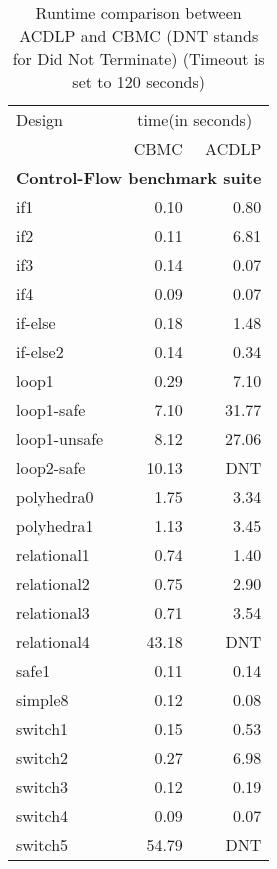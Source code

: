 \documentclass{article}
\begin{document}
\begin{table}[!b]
\begin{center}
{
\begin{tabular}{l|r|r}
\hline
  Design & \multicolumn{2}{c}{time(in seconds)} \\ 
  \cline{2-3}
  & CBMC & ACDLP \\ \hline
  \multicolumn{3}{c}{\textbf{Control-Flow benchmark suite}} \\ \hline 
  if1&0.10 & 0.80
  \\ \hline 
  if2&0.11 & 6.81
  \\ \hline 
  if3&0.14 & 0.07
  \\ \hline 
  if4&0.09 & 0.07
  \\ \hline 
  if-else&0.18 & 1.48
  \\ \hline 
  if-else2&0.14 & 0.34
  \\ \hline 
  loop1& 0.29  & 7.10
  \\ \hline 
  loop1-safe& 7.10 & 31.77
  \\ \hline 
  loop1-unsafe& 8.12 & 27.06
  \\ \hline 
  loop2-safe& 10.13 & DNT
  \\ \hline 
  polyhedra0& 1.75 & 3.34
  \\ \hline 
  polyhedra1& 1.13 & 3.45
  \\ \hline 
  relational1& 0.74 & 1.40
  \\ \hline 
  relational2 & 0.75 & 2.90
  \\ \hline 
  relational3& 0.71 & 3.54
  \\ \hline 
  relational4& 43.18 & DNT
  \\ \hline 
  safe1& 0.11 & 0.14
  \\ \hline 
  simple8& 0.12 & 0.08
  \\ \hline 
  switch1& 0.15 & 0.53
  \\ \hline 
  switch2& 0.27 & 6.98
  \\ \hline 
  switch3 & 0.12 & 0.19
  \\ \hline 
  switch4 & 0.09 & 0.07
  \\ \hline 
  switch5& 54.79 & DNT
  \\ \hline 
\end{tabular}
}
\end{center}
\caption{Runtime comparison between ACDLP and CBMC (DNT stands for Did Not Terminate)
(Timeout is set to 120 seconds)}
\label{solver2}
\end{table}
%
\end{document}
